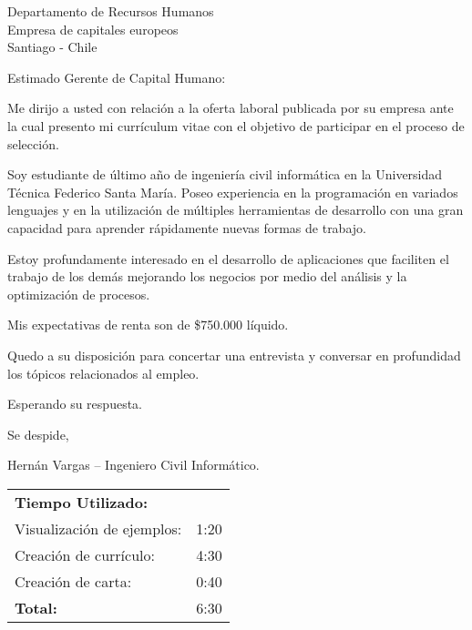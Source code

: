 \documentclass{letter}
\begin{document}
\begin{letter}{
    Departamento de Recursos Humanos\\
    Empresa de capitales europeos\\
    Santiago - Chile
}

\opening{Estimado Gerente de Capital Humano:}

Me dirijo a usted con relación a la oferta laboral publicada por su empresa ante 
la cual presento mi currículum vitae con el objetivo de participar en el proceso
de selección.

Soy estudiante de último año de ingeniería civil informática en la Universidad
Técnica Federico Santa María. Poseo experiencia en la programación en variados
lenguajes y en la utilización de múltiples herramientas de desarrollo con una
gran capacidad para aprender rápidamente nuevas formas de trabajo.

Estoy profundamente interesado en el desarrollo de aplicaciones que faciliten el
trabajo de los demás mejorando los negocios por medio del análisis y la
optimización de procesos. %


Mis expectativas de renta son de \$750.000 líquido.

Quedo a su disposición para concertar una entrevista y conversar en profundidad
los tópicos relacionados al empleo.

Esperando su respuesta.

Se despide,

Hernán Vargas -- Ingeniero Civil Informático.

\parskip 40pt

\begin{flushright}
    \begin{tabular}{lr}
        \textbf{Tiempo Utilizado:}  & \\
        Visualización de ejemplos:  & 1:20\\
        Creación de currículo:      & 4:30\\
        Creación de carta:          & 0:40\\
        \bf Total:                  & 6:30
    \end{tabular}
\end{flushright}
\end{letter}
\end{document}
